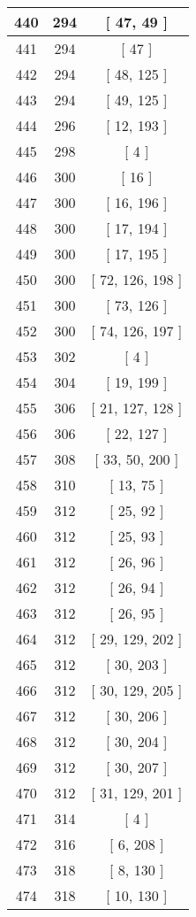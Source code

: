 \begin{center}
\begin{longtable}[H]{|| c c c ||}
\\\hline
440 & 294 & [ 47, 49 ]
\\\hline
441 & 294 & [ 47 ]
\\\hline
442 & 294 & [ 48, 125 ]
\\\hline
443 & 294 & [ 49, 125 ]
\\\hline
444 & 296 & [ 12, 193 ]
\\\hline
445 & 298 & [ 4 ]
\\\hline
446 & 300 & [ 16 ]
\\\hline
447 & 300 & [ 16, 196 ]
\\\hline
448 & 300 & [ 17, 194 ]
\\\hline
449 & 300 & [ 17, 195 ]
\\\hline
450 & 300 & [ 72, 126, 198 ]
\\\hline
451 & 300 & [ 73, 126 ]
\\\hline
452 & 300 & [ 74, 126, 197 ]
\\\hline
453 & 302 & [ 4 ]
\\\hline
454 & 304 & [ 19, 199 ]
\\\hline
455 & 306 & [ 21, 127, 128 ]
\\\hline
456 & 306 & [ 22, 127 ]
\\\hline
457 & 308 & [ 33, 50, 200 ]
\\\hline
458 & 310 & [ 13, 75 ]
\\\hline
459 & 312 & [ 25, 92 ]
\\\hline
460 & 312 & [ 25, 93 ]
\\\hline
461 & 312 & [ 26, 96 ]
\\\hline
462 & 312 & [ 26, 94 ]
\\\hline
463 & 312 & [ 26, 95 ]
\\\hline
464 & 312 & [ 29, 129, 202 ]
\\\hline
465 & 312 & [ 30, 203 ]
\\\hline
466 & 312 & [ 30, 129, 205 ]
\\\hline
467 & 312 & [ 30, 206 ]
\\\hline
468 & 312 & [ 30, 204 ]
\\\hline
469 & 312 & [ 30, 207 ]
\\\hline
470 & 312 & [ 31, 129, 201 ]
\\\hline
471 & 314 & [ 4 ]
\\\hline
472 & 316 & [ 6, 208 ]
\\\hline
473 & 318 & [ 8, 130 ]
\\\hline
474 & 318 & [ 10, 130 ]
\\\hline

\end{longtable}
\end{center}
